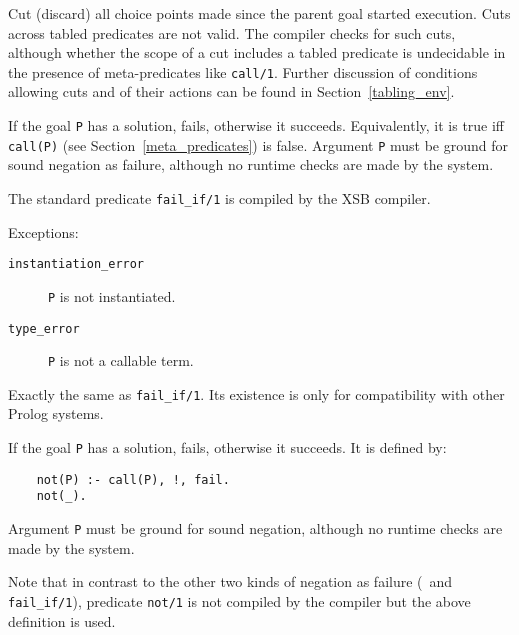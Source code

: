 \begin{description}
\ouritem{\cut}   
    Cut (discard) all choice points made since the parent goal
    started execution.
    Cuts across tabled predicates are not valid.  The compiler checks for
    such cuts, although whether the scope of a cut includes a tabled 
    predicate is undecidable in the presence of meta-predicates like
    {\tt call/1}.
    Further discussion of conditions allowing cuts and of their actions 
    can be found in Section~\ref{tabling_env}.

    If the goal {\tt P} has a solution, fails, otherwise it succeeds.
    Equivalently, it is true iff {\tt call(P)} 
    (see Section~\ref{meta_predicates}) is false. Argument {\tt P} 
    must be ground for sound negation as failure, although no runtime 
    checks are made by the system.

    The standard predicate {\tt fail\_if/1} is compiled by the 
    XSB compiler.

    Exceptions:
    \begin{description}
    \item[{\tt instantiation\_error}]
	{\tt P} is not instantiated.
    \item[{\tt type\_error}]
	{\tt P} is not a callable term.
    \end{description}


    Exactly the same as {\tt fail\_if/1}.  Its existence is only 
    for compatibility with other Prolog systems.

    If the goal {\tt P} has a solution, fails, otherwise it succeeds.
    It is defined by:
    \begin{center}
    \begin{minipage}{2.40in}
    \begin{verbatim}
	not(P) :- call(P), !, fail.
	not(_).
    \end{verbatim}
    \end{minipage}
    \end{center}

    Argument {\tt P} must be ground for sound negation, although no 
    runtime checks are made by the system.

    Note that in contrast to the other two kinds of negation as failure
    (\not\ and {\tt fail\_if/1}), predicate {\tt not/1} is not compiled
    by the compiler but the above definition is used.


\end{description}
